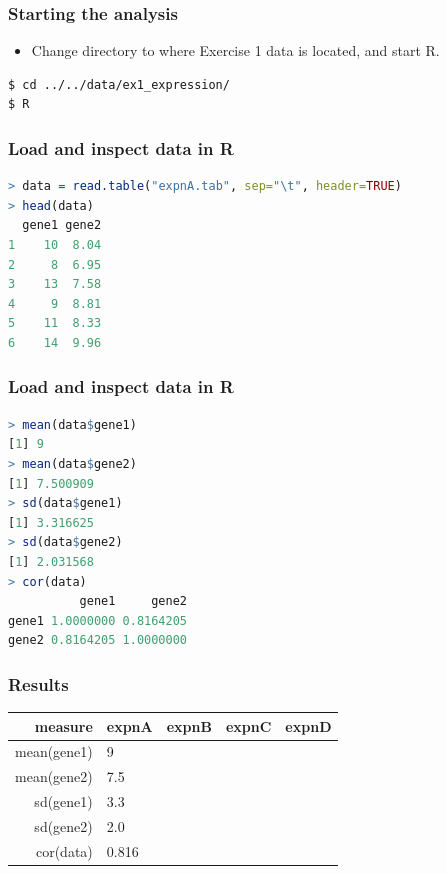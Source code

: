 \begin{frame}[fragile]
  \frametitle{Starting the analysis}
  \begin{itemize}
    \item Change directory to where Exercise 1 data is located, and start R.
  \end{itemize}
\begin{lstlisting}[language=bash]
$ cd ../../data/ex1_expression/
$ R
\end{lstlisting}
\end{frame}

\begin{frame}[fragile]
  \frametitle{Load and inspect data in R}
\begin{lstlisting}[language=R]
> data = read.table("expnA.tab", sep="\t", header=TRUE)
> head(data)
  gene1 gene2
1    10  8.04
2     8  6.95
3    13  7.58
4     9  8.81
5    11  8.33
6    14  9.96
\end{lstlisting}
\end{frame}

\begin{frame}[fragile]
  \frametitle{Load and inspect data in R}
\begin{lstlisting}[language=R]
> mean(data$gene1)
[1] 9
> mean(data$gene2)
[1] 7.500909
> sd(data$gene1)
[1] 3.316625
> sd(data$gene2)
[1] 2.031568
> cor(data)
          gene1     gene2
gene1 1.0000000 0.8164205
gene2 0.8164205 1.0000000
\end{lstlisting}
\end{frame}

\begin{frame}
  \frametitle{Results}
  \begin{center}
  \begin{tabular}{r|l|l|l|l}
          measure & expnA & expnB & expnC & expnD \\
	  \hline
	  mean(gene1) & 9     &  &  & \\
	  mean(gene2) & 7.5   &  &  & \\
  	  sd(gene1)   & 3.3   &  &  & \\
  	  sd(gene2)   & 2.0   &  &  & \\  
	  cor(data)   & 0.816 &  &  & \\  
  \end{tabular}
  \end{center}
\end{frame}

